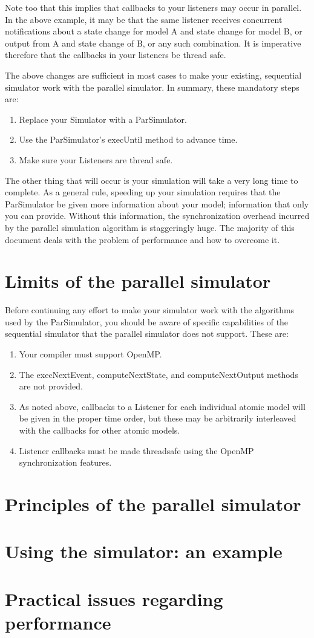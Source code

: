 Note too that this implies that callbacks to your listeners may occur in parallel. In the above example, it may be that the same listener receives concurrent notifications about a state change for model A and state change for model B, or output from A and state change of B, or any such combination. It is imperative therefore that the callbacks in your listeners be thread safe.

The above changes are sufficient in most cases to make your existing, sequential simulator work with the parallel simulator. In summary, these mandatory steps are:
\begin{enumerate}
\item Replace your Simulator with a ParSimulator.
\item Use the ParSimulator's execUntil method to advance time.
\item Make sure your Listeners are thread safe.
\end{enumerate}

The other thing that will occur is your simulation will take a very long time to complete. As a general rule, speeding up your simulation requires that the ParSimulator be given more information about your model; information that only you can provide. Without this information, the synchronization overhead incurred by the parallel simulation algorithm is staggeringly huge. The majority of this document deals with the problem of performance and how to overcome it. 

\section{Limits of the parallel simulator}
Before continuing any effort to make your simulator work with the algorithms used by the ParSimulator, you should be aware of specific capabilities of the sequential simulator that the parallel simulator does not support. These are:
\begin{enumerate}
\item Your compiler must support OpenMP.
\item The execNextEvent, computeNextState, and computeNextOutput methods are not provided.
\item As noted above, callbacks to a Listener for each individual atomic model will be given in the proper time order, but these may be arbitrarily interleaved with the callbacks for other atomic models.
\item Listener callbacks must be made threadsafe using the OpenMP synchronization features.
\end{enumerate}

\section{Principles of the parallel simulator}

\section{Using the simulator: an example}

\section{Practical issues regarding performance}

